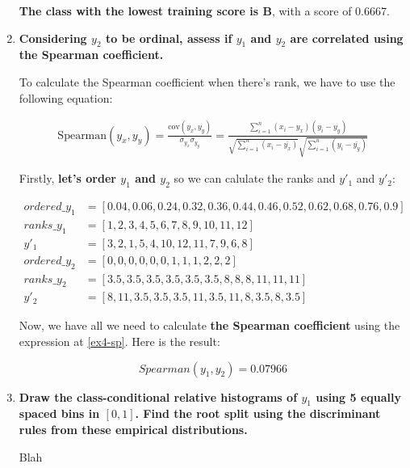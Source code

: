 \documentclass[12pt]{article}
\begin{document}
\begin{enumerate}[leftmargin=\labelsep]
    \textbf{The class with the lowest training score is B}, with a score of 0.6667.


    \item \textbf{Considering $y_2$ to be ordinal, assess if $y_1$ and $y_2$ are correlated using the Spearman coefficient.}

    \vskip 0.3cm

    To calculate the Spearman coefficient when there's rank, we have to use the following equation:

    \begin{equation}\label{ex4-sp}
        \begin{split}
            \text{Spearman}(y_x, y_y) = \frac{\text{cov}(y_x, y_y)}{\sigma_{y_x} \sigma_{y_y}}
            = \frac{\sum_{i=1}^{n} (x_i - y_x)(y_i - y_y)}{\sqrt{\sum_{i=1}^{n} (x_i- \bar{y_x})}\sqrt{\sum_{i=1}^{n} (y_i- \bar{y_y})}}
        \end{split}
    \end{equation}

    Firstly, \textbf{let's order $y_1$ and $y_2$} so we can calulate the ranks and $y'_1$ and $y'_2$:

    \begin{align*}
        ordered\_y_{1} & = [0.04, 0.06, 0.24, 0.32, 0.36, 0.44, 0.46, 0.52, 0.62, 0.68, 0.76, 0.9]\\
        ranks\_y_{1}   & = [1,2,3,4,5,6,7,8,9,10,11,12]\\
        y'_{1}         & = [3,2,1,5,4,10,12,11,7,9,6,8]\\
        ordered\_y_{2} & = [0,0,0,0,0,0,1,1,1,2,2,2]\\
        ranks\_y_{2}   & = [3.5, 3.5, 3.5, 3.5, 3.5, 3.5, 8, 8, 8, 11, 11, 11]\\
        y'_{2}         & = [8, 11, 3.5, 3.5, 3.5, 11, 3.5, 11, 8, 3.5, 8, 3.5]
    \end{align*}

    Now, we have all we need to calculate \textbf{the Spearman coefficient} using the expression at \eqref{ex4-sp}. Here is the result:

    \[
        Spearman(y_{1}, y_{2}) = 0.07966
    \]


    \item \textbf{Draw the class-conditional relative histograms of $y_1$ using 5 equally spaced bins in $[0,1]$.
    Find the root split using the discriminant rules from these empirical distributions.}

    \vskip 0.3cm
    Blah
\end{enumerate}
\end{document}
